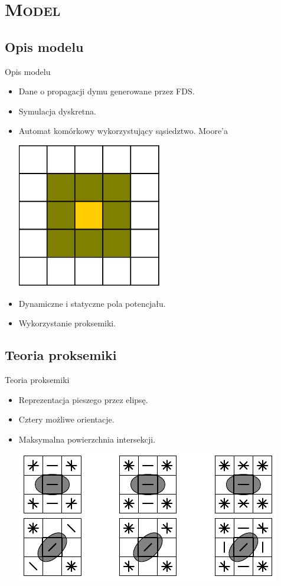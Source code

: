 \section{\scshape Model}

\subsection{Opis modelu}
\begin{frame}{Opis modelu}
	\begin{itemize}
	\item Dane o propagacji dymu generowane przez FDS.
	\item Symulacja dyskretna.
	\item Automat komórkowy wykorzystujący sąsiedztwo. Moore'a
	\begin{center}	
	\includegraphics[keepaspectratio=true, scale=0.5]{moore}
	\end{center}
	\item Dynamiczne i statyczne pola potencjału.
	\item Wykorzystanie proksemiki.
	\end{itemize}
\end{frame}

\subsection{Teoria proksemiki}
\begin{frame}{Teoria proksemiki}
 \begin{itemize}
 	\item Reprezentacja pieszego przez elipsę.
 	\item Cztery możliwe orientacje.
 	\item Maksymalna powierzchnia intersekcji.
 	\begin{center}	
	\includegraphics[keepaspectratio=true, scale = 0.5]{proxemics}
	\end{center}	
 \end{itemize}
\end{frame}

